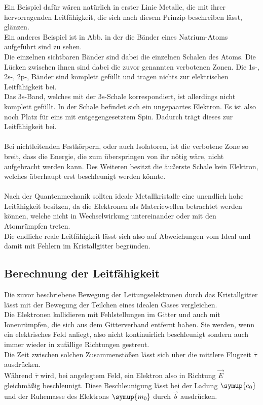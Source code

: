 \noindent
Ein Beispiel dafür wären natürlich in erster Linie Metalle, die mit ihrer hervorragenden Leitfähigkeit, die sich nach diesem Prinzip beschreiben lässt, glänzen.\\
Ein anderes Beispiel ist in Abb. in der die Bänder eines Natrium-Atoms aufgeführt sind zu sehen.\\
Die einzelnen sichtbaren Bänder sind dabei die einzelnen Schalen des Atoms.
Die Lücken zwischen ihnen sind dabei die zuvor genannten verbotenen Zonen.
Die 1s-, 2s-, 2p-, Bänder sind komplett gefüllt und tragen nichts zur elektrischen Leitfähigkeit bei.\\
Das 3s-Band, welches mit der 3s-Schale korrespondiert, ist allerdings nicht komplett gefüllt.
In der Schale befindet sich ein ungepaartes Elektron. Es ist also noch Platz für eins mit entgegengesetztem Spin.
Dadurch trägt dieses zur Leitfähigkeit bei.\\\\
\noindent
Bei nichtleitenden Festkörpern, oder auch Isolatoren, ist die verbotene Zone so breit, dass die Energie, 
die zum überspringen von ihr nötig wäre, nicht aufgebracht werden kann. Des Weiteren besitzt die äußerste Schale kein Elektron, welches
überhaupt erst beschleunigt werden könnte.\\\\
\noindent
Nach der Quantenmechanik sollten ideale Metallkristalle eine unendlich hohe Leitähigkeit besitzen, da
die Elektronen als Materiewellen betrachtet werden können, welche nicht in Wechselwirkung untereinander oder mit den Atomrümpfen treten.\\
Die endliche reale Leitfähigkeit lässt sich also auf Abweichungen vom Ideal und damit mit Fehlern im Kristallgitter begründen.\\


\subsection{Berechnung der Leitfähigkeit}

Die zuvor beschriebene Bewegung der Leitungselektronen durch das Kristallgitter lässt 
mit der Bewegung der Teilchen eines idealen Gases vergleichen.\\
Die Elektronen kollidieren mit Fehlstellungen im Gitter und auch mit Ionenrümpfen, die sich aus dem Gitterverband entfernt haben.
Sie werden, wenn ein elektrisches Feld anliegt, also nicht kontinuirlich beschleunigt sondern auch immer wieder in zufällige Richtungen gestreut.\\
Die Zeit zwischen solchen Zusammenstößen lässt sich über die mittlere Flugzeit $\overline{\tau}$ ausdrücken.\\
Während $\overline{\tau}$ wird, bei angelegtem Feld, ein Elektron also in Richtung $\vec{E}$ gleichmäßig beschleunigt.
Diese Beschleunigung lässt bei der Ladung $\symup{e_0}$\cite{e0} und der Ruhemasse des Elektrons $\symup{m_0}$\cite{m0} durch $\vec{b}$ ausdrücken.

